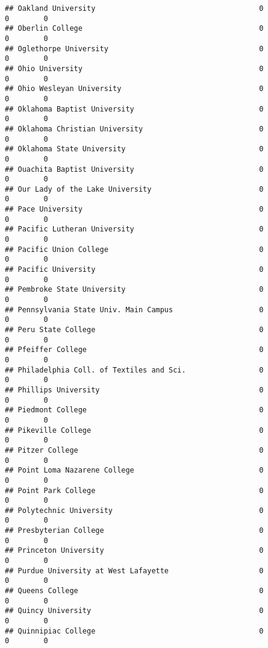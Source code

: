 \documentclass[
]{article}
\begin{document}
\begin{verbatim}
## Oakland University                                      0           0        0
## Oberlin College                                         0           0        0
## Oglethorpe University                                   0           0        0
## Ohio University                                         0           0        0
## Ohio Wesleyan University                                0           0        0
## Oklahoma Baptist University                             0           0        0
## Oklahoma Christian University                           0           0        0
## Oklahoma State University                               0           0        0
## Ouachita Baptist University                             0           0        0
## Our Lady of the Lake University                         0           0        0
## Pace University                                         0           0        0
## Pacific Lutheran University                             0           0        0
## Pacific Union College                                   0           0        0
## Pacific University                                      0           0        0
## Pembroke State University                               0           0        0
## Pennsylvania State Univ. Main Campus                    0           0        0
## Peru State College                                      0           0        0
## Pfeiffer College                                        0           0        0
## Philadelphia Coll. of Textiles and Sci.                 0           0        0
## Phillips University                                     0           0        0
## Piedmont College                                        0           0        0
## Pikeville College                                       0           0        0
## Pitzer College                                          0           0        0
## Point Loma Nazarene College                             0           0        0
## Point Park College                                      0           0        0
## Polytechnic University                                  0           0        0
## Presbyterian College                                    0           0        0
## Princeton University                                    0           0        0
## Purdue University at West Lafayette                     0           0        0
## Queens College                                          0           0        0
## Quincy University                                       0           0        0
## Quinnipiac College                                      0           0        0

\end{verbatim}
\end{document}
